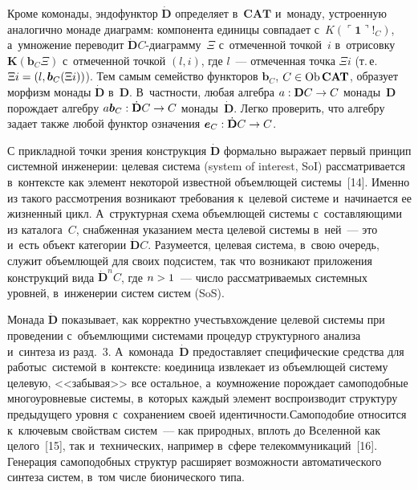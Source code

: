 \begin{multicols}{2}
     Кроме комонады, эндофунктор $\dot{\mathbf{D}}$ определяет в~$\mathbf{CAT}$ и~монаду, устроенную аналогично монаде диаграмм: 
компонента единицы совпадает с~$K(\ulcorner \bm{1}\urcorner !_C)$, 
а~умножение переводит $\dot{\mathbf{D}}C$-диа\-грам\-му~$\Xi$ 
с~отмеченной точкой~$i$ в~отрисовку $\mathbf{K}(\bm{b}_C\Xi)$ 
с~отмеченной точкой $(l, i)$, где $l$~--- отмеченная точка $\Xi i$ (т.\,е.\ 
$\Xi i \hm= (l, \bm{b}_C(\Xi i))$). Тем самым семейство функторов 
$\bm{b}_C$, $C \hm\in\mathrm{Ob}\,\mathbf{CAT}$, образует морфизм монады 
$\dot{\mathbf{D}}$ в~$\mathbf{D}$. В~частности, любая алгебра $a : 
\mathbf{D}C \hm\to  C$ монады~$\mathbf{D}$ порождает алгебру $a\bm{b}_C : 
\dot{\mathbf{D}}C \hm\to  C$ монады~$\dot{\mathbf{D}}$. Легко проверить, 
что алгебру задает также любой функтор означения $\bm{e}_C : 
\dot{\mathbf{D}}C \hm\to C$.
     
     С прикладной точки зрения конструкция $\dot{\mathbf{D}}$ формально 
выражает первый принцип системной инженерии: целевая система (system of 
interest, SoI) рассматривается в~контексте как элемент некоторой известной 
объемлющей системы~[14]. Именно из такого рассмотрения возникают 
требования к~целевой системе и~начинается ее жизненный цикл. А~структурная 
схема объемлющей системы с~со\-став\-ля\-ющи\-ми из каталога~$C$, снабженная 
указанием места целевой сис\-те\-мы в~ней~--- это и~есть объект категории 
$\dot{\mathbf{D}}C$. Разумеется, целевая сис\-те\-ма, в~свою очередь, служит 
объемлющей для своих под\-сис\-тем, так что возникают приложения конструкций 
вида $\dot{\mathbf{D}}^nC$, где $n \hm> 1$~--- чис\-ло рассматриваемых 
системных уровней, в~инженерии систем систем (SoS).
     
     Монада $\dot{\mathbf{D}}$ показывает, как корректно учесть\linebreak вхождение 
целевой системы при проведении с~объемлющими сис\-те\-ма\-ми процедур 
структурного анализа и~синтеза из разд.~3. 
А~комонада~$\dot{\mathbf{D}}$ предоставляет специфические средства для 
работы\linebreak с~системой в~контексте: коединица извлекает из объемлющей систему 
целевую, <<забывая>> все остальное, а~коумножение порождает самоподобные 
многоуровневые системы, в~которых каж\-дый элемент воспроизводит структуру 
предыдущего уровня с~сохранением своей иден\-тич\-ности.\linebreak Самоподобие 
относится к~ключевым свойствам сис\-тем~--- как природных, вплоть до 
Вселенной как целого~[15], так и~технических, например в~сфере 
телекоммуникаций~[16]. Генерация самоподобных структур расширяет 
возможности автоматического синтеза сис\-тем, в~том чис\-ле бионического типа.


\end{multicols}
